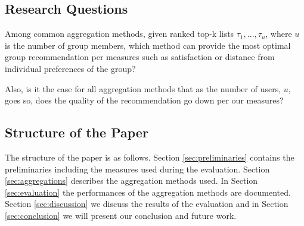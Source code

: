 \subsection{Research Questions}

Among common aggregation methods, given ranked top-k lists $\tau_1, ... , \tau_u$, where $u$ is the number of group members, which method can provide the most optimal group recommendation per measures such as satisfaction or distance from individual preferences of the group?

Also, is it the case for all aggregation methods that as the number of users, $u$, goes so, does the quality of the recommendation go down per our measures?

\subsection{Structure of the Paper}
The structure of the paper is as follows. Section \ref{sec:preliminaries} contains the preliminaries including the measures used during the evaluation. Section \ref{sec:aggregations} describes the aggregation methods used. In Section \ref{sec:evaluation} the performances of the aggregation methods are documented. Section \ref{sec:discussion} we discuss the results of the evaluation and in Section \ref{sec:conclusion} we will present our conclusion and future work.